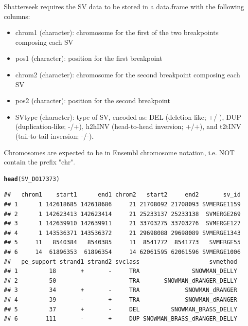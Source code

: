 \documentclass[twoside,a4wide,11pt]{article}\usepackage[]{graphicx}\usepackage[]{color}
\makeatletter
\newcommand{\hlstd}[1]{\textcolor[rgb]{0.345,0.345,0.345}{#1}}%
\newcommand{\hlkwd}[1]{\textcolor[rgb]{0.737,0.353,0.396}{\textbf{#1}}}%
\newenvironment{kframe}{%
 \def\at@end@of@kframe{}%
 \ifinner\ifhmode%
  \def\at@end@of@kframe{\end{minipage}}%
  \begin{minipage}{\columnwidth}%
 \fi\fi%
 \def\FrameCommand##1{\hskip\@totalleftmargin \hskip-\fboxsep
 \colorbox{shadecolor}{##1}\hskip-\fboxsep
     \hskip-\linewidth \hskip-\@totalleftmargin \hskip\columnwidth}%
 \MakeFramed {\advance\hsize-\width
   \@totalleftmargin\z@ \linewidth\hsize
   \@setminipage}}%
 {\par\unskip\endMakeFramed%
 \at@end@of@kframe}
\newenvironment{knitrout}{}{} %
\makeatother
\begin{document}
Shatterseek requires the SV data to be stored in a data.frame with the following columns: 
\begin{itemize}
\item chrom1 (character): chromosome for the first of the two breakpoints composing each SV
\item pos1 (character): position for the first breakpoint
\item chrom2 (character): chromosome for the second breakpoint composing each SV
\item pos2 (character): position for the second breakpoint
\item SVtype (character): type of SV, encoded as: DEL (deletion-like; +/-), DUP (duplication-like; -/+),
h2hINV (head-to-head inversion; +/+), and t2tINV (tail-to-tail inversion; -/-).
\end{itemize}
Chromosomes are expected to be in Ensembl chromosome notation, i.e. NOT contain the prefix "chr".\\
\begin{knitrout}
\color{fgcolor}\begin{kframe}
\begin{alltt}
\hlkwd{head}\hlstd{(SV_DO17373)}
\end{alltt}
\begin{verbatim}
##   chrom1    start1      end1 chrom2   start2     end2       sv_id
## 1      1 142618685 142618686     21 21708092 21708093 SVMERGE1159
## 2      1 142623413 142623414     21 25233137 25233138  SVMERGE269
## 3      1 142639910 142639911     21 33703275 33703276  SVMERGE127
## 4      1 143536371 143536372     21 29698088 29698089 SVMERGE1343
## 5     11   8540384   8540385     11  8541772  8541773   SVMERGE55
## 6     14  61896353  61896354     14 62061595 62061596 SVMERGE1006
##   pe_support strand1 strand2 svclass                    svmethod
## 1         18       +       -     TRA               SNOWMAN_DELLY
## 2         50       -       -     TRA       SNOWMAN_dRANGER_DELLY
## 3         34       +       -     TRA             SNOWMAN_dRANGER
## 4         39       -       +     TRA             SNOWMAN_dRANGER
## 5         37       +       -     DEL         SNOWMAN_BRASS_DELLY
## 6        111       -       +     DUP SNOWMAN_BRASS_dRANGER_DELLY
\end{verbatim}
\end{kframe}
\end{knitrout}



\end{document}
